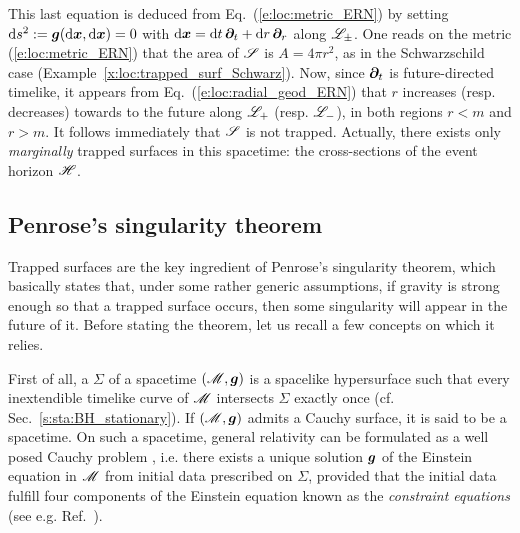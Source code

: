 \begin{example}
\ee
This last equation is deduced from Eq.~(\ref{e:loc:metric_ERN})
by setting $\mathrm{d} s^2 := \bm{g}(\mathrm{d}\bm{x},\mathrm{d}\bm{x}) = 0$ with
$\mathrm{d}\bm{x} = \mathrm{d} t \, \bm{\partial}_t + \mathrm{d} r \, \bm{\partial}_r$ along $\mathscr{L}_{\pm}$.
One reads on the metric (\ref{e:loc:metric_ERN}) that the area of $\mathscr{S}$ is
$A=4\pi r^2$, as in the Schwarzschild case (Example~\ref{x:loc:trapped_surf_Schwarz}).
Now, since $\bm{\partial}_t$ is future-directed timelike, it appears from Eq.~(\ref{e:loc:radial_geod_ERN}) that $r$ increases (resp. decreases)
towards to the future along $\mathscr{L}_+$ (resp. $\mathscr{L}_-$), in both regions $r<m$ and $r>m$. It
follows immediately that $\mathscr{S}$ is not trapped. Actually, there exists only
\emph{marginally} trapped surfaces in this spacetime: the cross-sections of
the event horizon $\mathscr{H}$.
\end{example}

\subsection{Penrose's singularity theorem}

Trapped surfaces are the key ingredient of Penrose's singularity theorem,
which basically states that, under some rather generic assumptions, if gravity is
strong enough so that a trapped surface occurs, then some singularity will
appear in the future of it.
Before stating the theorem, let us recall a few concepts on which it relies.

First of all, a 
$\Sigma$ of a spacetime $(\mathscr{M},\bm{g})$ is a spacelike
hypersurface such that every inextendible timelike curve of $\mathscr{M}$
intersects $\Sigma$ exactly once (cf. Sec.~\ref{s:sta:BH_stationary}). If $(\mathscr{M},\bm{g})$
admits a Cauchy surface, it is said to be a
 spacetime.
On such a spacetime, general relativity can be formulated as a well posed
Cauchy problem \cite{ChoquG69},
i.e. there exists a unique solution $\bm{g}$ of the Einstein equation
in $\mathscr{M}$ from initial data prescribed on $\Sigma$, provided that the initial data
fulfill four components of the Einstein equation known as the
\emph{constraint equations}
(see e.g. Ref.~\cite{Gourg12}).

